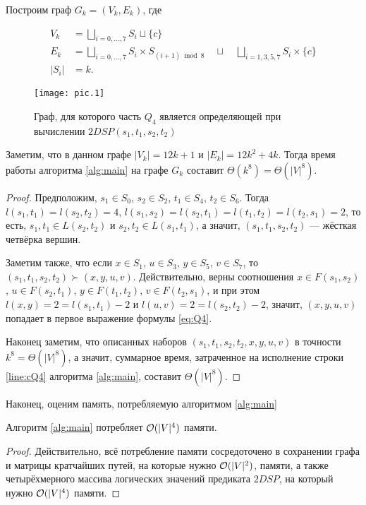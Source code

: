\begin{theorem}
Построим граф $G_k = (V_k, E_k)$, где 

\begin{align}
V_k &= \bigsqcup\limits_{i = 0,\ldots,7} S_i \sqcup \{c\} \\
E_k &= \bigsqcup\limits_{i = 0,\ldots,7} S_i \times S_{(i+1) \bmod 8} \quad\sqcup\quad \bigsqcup\limits_{i=1,3,5,7} S_i \times \{c\} \\
|S_i| &= k.
\end{align}

\begin{figure}[H]
\caption{Граф, для которого часть $Q_4$ является определяющей при вычислении $2DSP(s_1, t_1, s_2, t_2)$}
\centering
\texttt{[image: pic.1]}
\end{figure}

Заметим, что в данном графе $|V_k| = 12k + 1$ и $|E_k| = 12k^2 + 4k$. Тогда время работы алгоритма \ref{alg:main} на графе $G_k$ составит $\Theta(k^8) = \Theta(|V|^8)$.

\end{theorem}
\begin{proof}
Предположим, $s_1 \in S_0$, $s_2 \in S_2$, $t_1 \in S_4$, $t_2 \in S_6$. Тогда $l(s_1, t_1) = l(s_2, t_2) = 4$, $l(s_1, s_2) = l(s_2, t_1) = l(t_1, t_2) = l(t_2, s_1) = 2$, то есть, $s_1, t_1 \in L(s_2, t_2)$ и $s_2, t_2 \in L(s_1, t_1)$, а значит, $(s_1, t_1, s_2, t_2)$ --- жёсткая четвёрка вершин.

Заметим также, что если $x \in S_1$, $u \in S_3$, $y \in S_5$, $v \in S_7$, то $(s_1, t_1, s_2, t_2) \succ (x, y, u, v)$. Действительно, верны соотношения $x \in F(s_1, s_2)$, $u \in F(s_2, t_1)$, $y \in F(t_1, t_2)$, $v \in F(t_2, s_1)$, и при этом $l(x, y) = 2 = l(s_1, t_1) - 2$ и $l(u, v) = 2 = l(s_2, t_2) - 2$, значит, $(x, y, u, v)$ попадает в первое выражение формулы \ref{eq:Q4}.

Наконец заметим, что описанных наборов $(s_1, t_1, s_2, t_2, x, y, u, v)$ в точности $k^8 = \Theta(|V|^8)$, а значит, суммарное время, затраченное на исполнение строки \ref{line:cQ4} алгоритма \ref{alg:main}, составит $\Theta(|V|^8)$.
\end{proof}

Наконец, оценим память, потребляемую алгоритмом \ref{alg:main}
\begin{theorem}
Алгоритм \ref{alg:main} потребляет $\mathcal{O}(|V|^4)$ памяти.
\end{theorem}
\begin{proof}
Действительно, всё потребление памяти сосредоточено в сохранении графа и матрицы кратчайших путей, на которые нужно $\mathcal{O}(|V|^2)$, памяти, а также четырёхмерного массива логических значений предиката $2DSP$, на который нужно $\mathcal{O}(|V|^4)$ памяти.
\end{proof}
